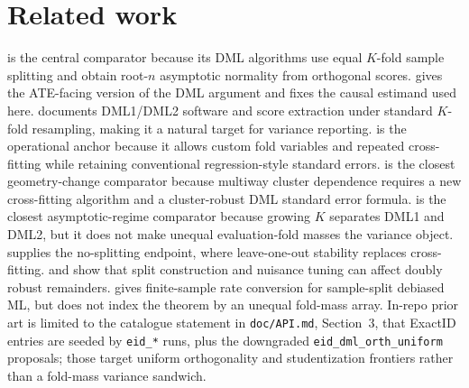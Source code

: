 \documentclass[11pt]{article}
\theoremstyle{definition}
\theoremstyle{plain}
\theoremstyle{remark}
\begin{document}
\section{Related work}
\citet{ChernozhukovEtAl2018DML} is the central comparator because its DML algorithms use equal \(K\)-fold sample splitting and obtain root-\(n\) asymptotic normality from orthogonal scores. \citet{ChernozhukovEtAl2017DMLATE} gives the ATE-facing version of the DML argument and fixes the causal estimand used here. \citet{BachEtAl2024DoubleMLR} documents DML1/DML2 software and score extraction under standard \(K\)-fold resampling, making it a natural target for variance reporting. \citet{AhrensHansenSchafferWiemann2024DDML} is the operational anchor because it allows custom fold variables and repeated cross-fitting while retaining conventional regression-style standard errors. \citet{ChiangKatoMaSasaki2022MultiwayDML} is the closest geometry-change comparator because multiway cluster dependence requires a new cross-fitting algorithm and a cluster-robust DML standard error formula. \citet{Velez2024DMLGrowingK} is the closest asymptotic-regime comparator because growing \(K\) separates DML1 and DML2, but it does not make unequal evaluation-fold masses the variance object. \citet{ChenSyrgkanisAustern2022NoSplitDML} supplies the no-splitting endpoint, where leave-one-out stability replaces cross-fitting. \citet{NeweyRobins2018CrossFitting} and \citet{McGrathMukherjee2022NuisanceTuningSplitting} show that split construction and nuisance tuning can affect doubly robust remainders. \citet{ChernozhukovNeweySingh2023FiniteSampleDML} gives finite-sample rate conversion for sample-split debiased ML, but does not index the theorem by an unequal fold-mass array. In-repo prior art is limited to the catalogue statement in \texttt{doc/API.md}, Section~3, that ExactID entries are seeded by \texttt{eid\_*} runs, plus the downgraded \texttt{eid\_dml\_orth\_uniform} proposals; those target uniform orthogonality and studentization frontiers rather than a fold-mass variance sandwich.
\end{document}
